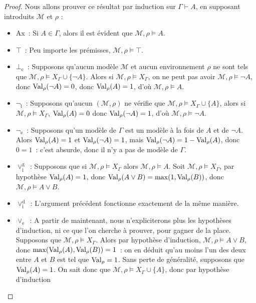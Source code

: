 \begin{proof}
  Nous allons prouver ce résultat par induction sur $\Gamma\vdash A$, en
  supposant introduits $\mathcal M$ et $\rho$ :
  \begin{itemize}
  \item Ax~: Si $A\in \Gamma$, alors il est évident que
    $\mathcal M,\rho\models A$.
  \item $\top$~: Peu importe les prémisses, $\mathcal M,\rho\models \top$.
  \item $\bot_\mathrm c$~: Supposons qu'aucun modèle $\mathcal M$ et aucun
    environnement $\rho$ ne sont tels que
    $\mathcal M,\rho\models X_\Gamma\cup\{\lnot A\}$. Alors si
    $\mathcal M,\rho\models X_\Gamma$, on ne peut pas avoir
    $\mathcal M,\rho\models \lnot A$, donc $\operatorname{Val}_\rho(\lnot A) = 0$, donc
    $\operatorname{Val}_\rho(A) = 1$, d'où $\mathcal M,\rho\models A$.
  \item $\lnot_\mathrm i$~: Supposons qu'aucun $(\mathcal M,\rho)$ ne vérifie que
    $\mathcal M,\rho\models X_\Gamma\cup\{A\}$, alors si
    $\mathcal M,\rho\models X_\Gamma$, $\operatorname{Val}_\rho(A) = 0$ donc
    $\operatorname{Val}_\rho(\lnot A) = 1$, d'où $\mathcal M,\rho\models \lnot A$.
  \item $\lnot_\mathrm e$~: Supposons qu'un modèle de $\Gamma$ est un modèle à la
    fois de $A$ et de $\lnot A$. Alors $\operatorname{Val}_\rho(A) = 1$ et
    $\operatorname{Val}_\rho(\lnot A) = 1$, mais $\operatorname{Val}_\rho(\lnot A) = 1 - \operatorname{Val}_\rho(A)$, donc
    $0 = 1$~: c'est absurde, donc il n'y a pas de modèle de $\Gamma$.
  \item $\lor_\mathrm i^\mathrm g$~: Supposons que si
    $\mathcal M,\rho\models X_\Gamma$ alors $\mathcal M,\rho\models A$. Soit
    $\mathcal M,\rho\models X_\Gamma$, par
    hypothèse $\operatorname{Val}_\rho(A) = 1$, donc
    $\operatorname{Val}_\rho(A\lor B) = \max(1,\operatorname{Val}_\rho(B))$, donc
    $\mathcal M,\rho\models A\lor B$.
  \item $\lor_\mathrm i^\mathrm d$~: L'argument précédent fonctionne exactement de
    la même manière.
  \item $\lor_\mathrm e$~: A partir de maintenant, nous n'expliciterons plus les
    hypothèses d'induction, ni ce que l'on cherche à prouver, pour gagner de la
    place. Supposons que $\mathcal M,\rho\models X_\Gamma$. Alors par hypothèse
    d'induction, $\mathcal M,\rho\models A\lor B$, donc
    $\max(\operatorname{Val}_\rho(A),\operatorname{Val}_\rho(B)) = 1$~: on en déduit qu'au moins l'un des
    deux entre $A$ et $B$ est tel que $\operatorname{Val}_\rho = 1$. Sans perte de généralité,
    supposons que $\operatorname{Val}_\rho(A) = 1$. On sait donc que
    $\mathcal M,\rho\models X_\Gamma\cup\{A\}$, donc par hypothèse d'induction

\end{itemize}
\end{proof}
